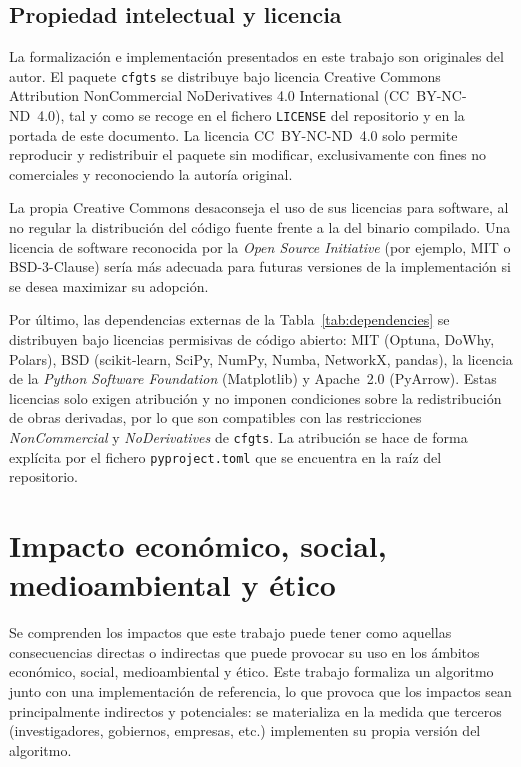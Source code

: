 \documentclass[12pt]{report} %
\begin{document}
\section{Propiedad intelectual y licencia}

La formalización e implementación presentados en este trabajo son originales del autor. El paquete \texttt{cfgts} se distribuye bajo licencia Creative Commons Attribution NonCommercial NoDerivatives 4.0 International (CC~BY-NC-ND~4.0), tal y como se recoge en el fichero \texttt{LICENSE} del repositorio y en la portada de este documento. La licencia CC~BY-NC-ND~4.0 solo permite reproducir y redistribuir el paquete sin modificar, exclusivamente con fines no comerciales y reconociendo la autoría original.

La propia Creative Commons desaconseja el uso de sus licencias para software, al no regular la distribución del código fuente frente a la del binario compilado. Una licencia de software reconocida por la \textit{Open Source Initiative} (por ejemplo, MIT o BSD-3-Clause) sería más adecuada para futuras versiones de la implementación si se desea maximizar su adopción.

Por último, las dependencias externas de la Tabla~\ref{tab:dependencies} se distribuyen bajo licencias permisivas de código abierto: MIT (Optuna, DoWhy, Polars), BSD (scikit-learn, SciPy, NumPy, Numba, NetworkX, pandas), la licencia de la \textit{Python Software Foundation} (Matplotlib) y Apache~2.0 (PyArrow). Estas licencias solo exigen atribución y no imponen condiciones sobre la redistribución de obras derivadas, por lo que son compatibles con las restricciones \textit{NonCommercial} y \textit{NoDerivatives} de \texttt{cfgts}. La atribución se hace de forma explícita por el fichero \texttt{pyproject.toml} que se encuentra en la raíz del repositorio.

\chapter{Impacto económico, social, medioambiental y ético}
\label{cap:impacto}

Se comprenden los impactos que este trabajo puede tener como aquellas consecuencias directas o indirectas que puede provocar su uso en los ámbitos económico, social, medioambiental y ético. Este trabajo formaliza un algoritmo junto con una implementación de referencia, lo que provoca que los impactos sean principalmente indirectos y potenciales: se materializa en la medida que terceros (investigadores, gobiernos, empresas, etc.) implementen su propia versión del algoritmo.
\end{document}
